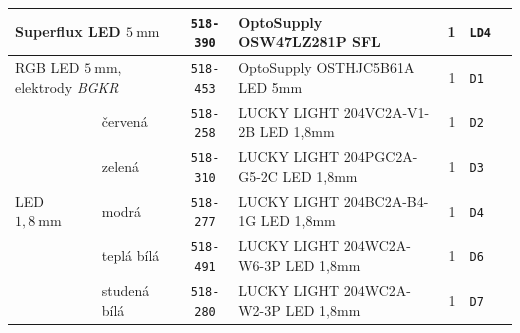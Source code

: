 \documentclass[twoside,project,skipblank]{../MFFPrace}
\begin{document}
\begin{landscape}
\begin{table}[!h]
\begin{tabular}{|l|l||c|l|r||l|l|l|l|}
            \multicolumn{2}{|l||}{Superflux LED $5\:\text{mm}$}                          & \texttt{518-390}                               & \tiny{OptoSupply OSW47LZ281P SFL}                & 1                                                        & \texttt{LD4}                         & \multicolumn{3}{l|}{}                                                                  \\\hline
            \multicolumn{2}{|l||}{RGB LED $5\:\text{mm}$, elektrody \textit{BGKR}}       & \texttt{518-453}                               & \tiny{OptoSupply OSTHJC5B61A LED 5mm}            & 1                                                        & \texttt{D1}                          & \multicolumn{3}{l|}{}                                                                  \\\hline
            \multirow{6}{*}{LED $1{,}8\:\text{mm}$}                                      & červená                                        & \texttt{518-258}                                 & \tiny{LUCKY LIGHT 204VC2A-V1-2B LED 1,8mm}               & 1                                    & \texttt{D2}           & \multicolumn{3}{l|}{}                                          \\\cline{2-9}
                                                                                         & zelená                                         & \texttt{518-310}                                 & \tiny{LUCKY LIGHT 204PGC2A-G5-2C LED 1,8mm}              & 1                                    & \texttt{D3}           & \multicolumn{3}{l|}{}                                          \\\cline{2-9}
                                                                                         & modrá                                          & \texttt{518-277}                                 & \tiny{LUCKY LIGHT 204BC2A-B4-1G LED 1,8mm}               & 1                                    & \texttt{D4}           & \multicolumn{3}{l|}{}                                          \\\cline{2-9}
                                                                                         & teplá bílá                                     & \texttt{518-491}                                 & \tiny{LUCKY LIGHT 204WC2A-W6-3P LED 1,8mm}               & 1                                    & \texttt{D6}           & \multicolumn{3}{l|}{}                                          \\\cline{2-9}
                                                                                         & studená bílá                                   & \texttt{518-280}                                 & \tiny{LUCKY LIGHT 204WC2A-W2-3P LED 1,8mm}               & 1                                    & \texttt{D7}           & \multicolumn{3}{l|}{}                                          \\\hline

\end{tabular}
\end{table}
\end{landscape}
\end{document}
